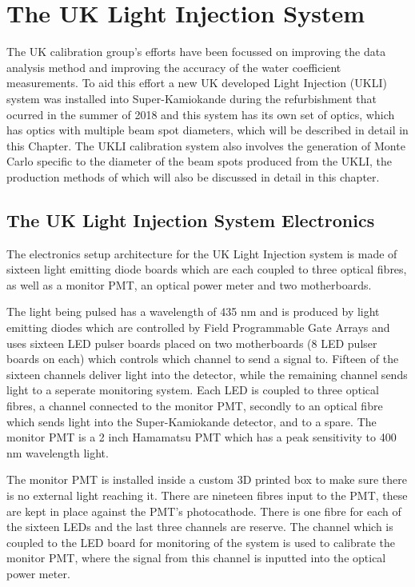 \chapter{The UK Light Injection System}
\label{chp:ukli}

The UK calibration group's efforts have been focussed on improving the data analysis method and improving the accuracy of the water coefficient measurements. To aid this effort a new UK developed Light Injection (UKLI) system was installed into Super-Kamiokande during the refurbishment that ocurred in the summer of 2018 and this system has its own set of optics, which has optics with multiple beam spot diameters, which will be described in detail in this Chapter. The UKLI calibration system also involves the generation of Monte Carlo specific to the diameter of the beam spots produced from the UKLI, the production methods of which will also be discussed in detail in this chapter.

\section{The UK Light Injection System Electronics}

The electronics setup architecture for the UK Light Injection system is made of sixteen light emitting diode boards which are each coupled to three optical fibres, as well as a monitor PMT, an optical power meter and two motherboards.

The light being pulsed has a wavelength of 435 nm and is produced by light emitting diodes which are controlled by Field Programmable Gate Arrays and uses sixteen LED pulser boards placed on two motherboards (8 LED pulser boards on each) which controls which channel to send a signal to. Fifteen of the sixteen channels deliver light into the detector, while the remaining channel sends light to a seperate monitoring system. Each LED is coupled to three optical fibres, a channel connected to the monitor PMT, secondly to an optical fibre which sends light into the Super-Kamiokande detector, and to a spare. The monitor PMT is a 2 inch Hamamatsu PMT which has a peak sensitivity to 400 nm wavelength light.
\newline

The monitor PMT is installed inside a custom 3D printed box to make sure there is no external light reaching it. There are nineteen fibres input to the PMT, these are kept in place against the PMT's photocathode. There is one fibre for each of the sixteen LEDs and the last three channels are reserve. The channel which is coupled to the LED board for monitoring of the system is used to calibrate the monitor PMT, where the signal from this channel is inputted into the optical power meter.

